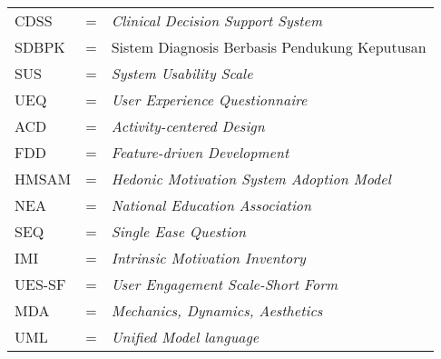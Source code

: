 \begin{center}
\end{center}

\begin{tabular}{llp{3in}}
	CDSS &  \hspace{1.5cm} = &	\textit{Clinical Decision Support System}\\
	SDBPK &  \hspace{1.5cm} = &	Sistem Diagnosis Berbasis Pendukung Keputusan\\
	SUS	& \hspace{1.5cm} = & \textit{System Usability Scale} \\
	UEQ & \hspace{1.5cm} = & \textit{User Experience Questionnaire }\\ 
	ACD & \hspace{1.5cm} = & \textit{Activity-centered Design} \\
	FDD & \hspace{1.5cm} = & \textit{Feature-driven Development} \\
	HMSAM & \hspace{1.5cm} = & \textit{Hedonic Motivation System Adoption Model } \\
	NEA & \hspace{1.5cm} = & \textit{National Education Association } \\
	SEQ & \hspace{1.5cm} = & \textit{Single Ease Question } \\
	IMI & \hspace{1.5cm} = & \textit{Intrinsic Motivation Inventory} \\
	UES-SF & \hspace{1.5cm} = & \textit{User Engagement Scale-Short Form} \\
	MDA & \hspace{1.5cm} = & \textit{Mechanics, Dynamics, Aesthetics} \\
	UML & \hspace{1.5cm} = & \textit{Unified Model language} \\
\end{tabular}
